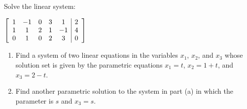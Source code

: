 \documentclass[12pt,letterpaper]{../hmcpset}
\begin{document}
\begin{solution}
\end{solution}
\newpage

\begin{problem}[38]
	Solve the linear system:
	\begin{center}
		$\left[
		\begin{array}{ccccc | c}
		1 & -1 & 0 & 3 &  1 & 2 \\
		1 &  1 & 2 & 1 & -1 & 4 \\
		0 &  1 & 0 & 2 &  3 & 0
		\end{array}
		\right]$
	\end{center}
\end{problem}

\begin{solution}
\end{solution}
\newpage

\begin{problem}[40]
	\begin{enumerate}
		\item 
			Find a system of two linear equations in the variables $x_1$, $x_2$, and $x_3$ whose solution set is given by the parametric equations $x_1 = t$, $x_2 = 1 + t$, and $x_3 = 2 - t$.
		\item
			Find another parametric solution to the system in part (a) in which the parameter is $s$ and $x_3 = s$.
	\end{enumerate}
\end{problem}

\begin{solution}
\end{solution}
\newpage
\end{document}
